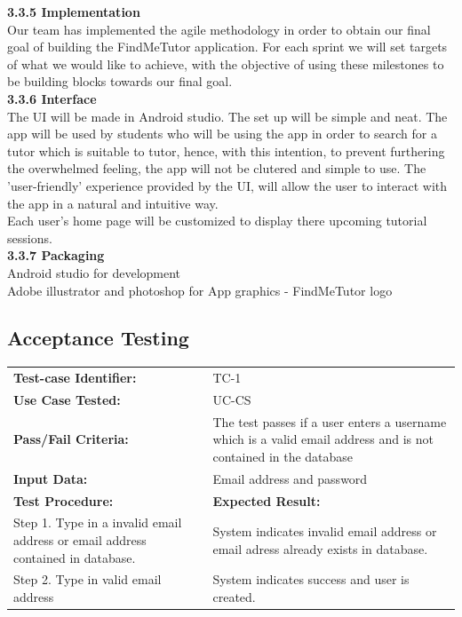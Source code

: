 \documentclass[12pt]{article}
\begin{document}
{\textbf{3.3.5 Implementation}\\
Our team has implemented the agile methodology in order to obtain our final goal of building the FindMeTutor application. For each sprint we will set targets of what we would like to achieve, with the objective of using these milestones to be building blocks towards our final goal.
\\\textbf{3.3.6 Interface}\\
The UI will be made in Android studio. The set up will be simple and neat. The app will be used by students who will be using the app in order to search for a tutor which is suitable to tutor, hence, with this intention, to prevent furthering the overwhelmed feeling, the app will not be clutered and simple to use. The 'user-friendly' experience provided by the UI, will allow the user to interact with the app in a natural and intuitive way. \\
Each user's home page will be customized to display there upcoming tutorial sessions.\\
\textbf{3.3.7 Packaging}\\
Android studio for development\\
Adobe illustrator and photoshop for App graphics - FindMeTutor logo\\
}


\subsection{Acceptance Testing}


\begin{tabular}{| p{8cm} | p{8cm} |} \hline
	\textbf{Test-case Identifier:}& TC-1\\
	\textbf{Use Case Tested:}& UC-CS\\
	\textbf{Pass/Fail Criteria:}& The test passes if a user enters a username which is a valid email address
	and is not contained in the database\\
	\textbf{Input Data:}& Email address and password\\\hline
	\textbf{Test Procedure:}& \textbf{Expected Result:} \\\hline
	Step 1. Type in a invalid email address or email address contained in database.
	& System indicates invalid email address or email adress already exists in database.\\
	Step 2. Type in valid email address  & System indicates success and user is created.\\\hline
\end{tabular}
\end{document}
